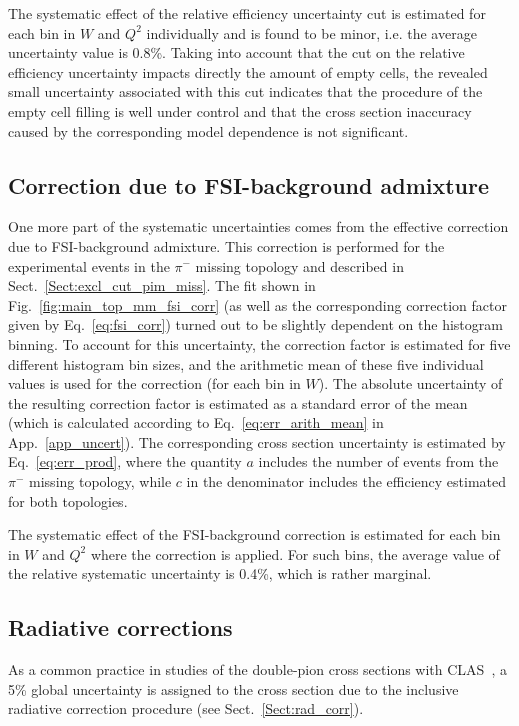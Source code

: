 The systematic effect of the relative efficiency uncertainty cut is estimated for each bin in $W$ and $Q^{2}$ individually and is found to be minor, i.e. the average uncertainty value is 0.8\%. Taking into account that the cut on the relative efficiency uncertainty impacts directly the amount of empty cells, the revealed small uncertainty associated with this cut indicates that the procedure of the empty cell filling is well under control and that the cross section inaccuracy caused by the corresponding model dependence is not significant. 


\subsection{Correction due to FSI-background admixture}

One more part of the systematic uncertainties comes from the effective correction due to FSI-background admixture. This correction is performed for the experimental events in the $\pi^{-}$ missing topology and described in Sect.~\ref{Sect:excl_cut_pim_miss}. The fit shown in Fig.~\ref{fig:main_top_mm_fsi_corr} (as well as the corresponding correction factor given by Eq.~\eqref{eq:fsi_corr}) turned out to be slightly dependent on the histogram binning. To account for this uncertainty, the correction factor is estimated for five different histogram bin sizes, and the arithmetic mean of these five individual values is used for the correction (for each bin in $W$). The absolute uncertainty of the resulting correction factor is estimated as a standard error of the mean (which is calculated according to Eq.~\eqref{eq:err_arith_mean} in App.~\ref{app_uncert}). The corresponding cross section uncertainty is estimated by Eq.~\eqref{eq:err_prod}, where the quantity $a$ includes the number of events from the $\pi^{-}$ missing topology, while $c$ in the denominator includes the efficiency estimated for both topologies. 

The systematic effect of the FSI-background correction is estimated for each bin in $W$ and $Q^{2}$ where the correction is applied. For such bins, the average value of the relative systematic uncertainty is 0.4\%, which is rather marginal.


\subsection{Radiative corrections}


As a common practice in studies of the double-pion cross sections with CLAS~\cite{Rip_an_note:2002,Ripani:2002ss,Fed_an_note:2007,Fedotov:2008aa,Isupov:2017lnd,Arjun,Fed_an_note:2017,Fed_paper_2018}, a 5\% global uncertainty is assigned to the cross section due to the inclusive radiative correction procedure (see Sect.~\ref{Sect:rad_corr}).


